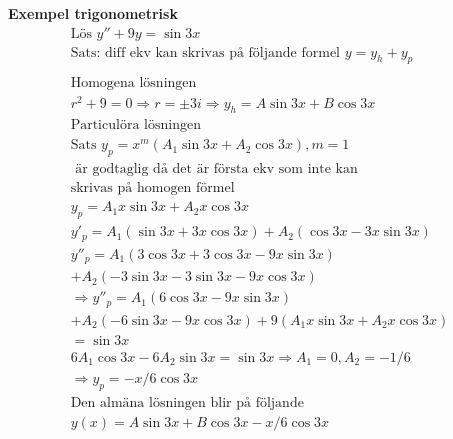 \begin{multicols}{2}
\textbf{Exempel trigonometrisk}
\begin{align*} %
  &\text{Lös } y'' + 9y = \sin{3x}  \\
  &\text{Sats: diff ekv kan skrivas på följande formel } y=y_h+y_p \\
  &\\
  &\text{Homogena lösningen } \\
  &r^2+9=0 \Rightarrow r=\pm3i \Rightarrow y_h=A\sin{3x} + B\cos{3x}
  &\\
  &\text{Particulöra lösningen } \\
  &\text{Sats } y_p=x^m(A_1\sin{3x}+A_2\cos{3x}), m=1 \\
  &\text{ är godtaglig då det är första ekv som inte kan} \\
  &\text{skrivas på homogen förmel} \\
  &y_p=A_1x\sin{3x}+A_2x\cos{3x} \\
  &y'_p=A_1(\sin{3x}+3x\cos{3x}) + A_2(\cos{3x}-3x\sin{3x}) \\
  &y''_p=A_1(3\cos{3x}+3\cos{3x}-9x\sin{3x}) \\
  &+ A_2(-3\sin{3x}-3\sin{3x}-9x\cos{3x}) \\
  &\Rightarrow y''_p=A_1(6\cos{3x}-9x\sin{3x}) \\
  &+ A_2(-6\sin{3x}-9x\cos{3x}) + 9(A_1x\sin{3x}+A_2x\cos{3x}) \\
  &= \sin{3x}\\
  &6A_1\cos{3x} - 6A_2\sin{3x} = \sin{3x} \Rightarrow A_1=0, A_2=-1/6 \\
  &\Rightarrow y_p = -x/6 \cos{3x}
  &\\
  &\text{Den almäna lösningen blir på följande } \\
  &y(x)= A\sin{3x}+B\cos{3x} -x/6 \cos{3x} \\
\end{align*}


\end{multicols}
